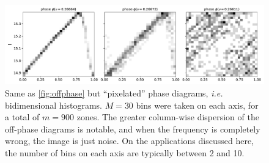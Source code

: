 	\begin{figure}
		\centering
		\includegraphics[width=\textwidth]{img/offhist2d.pdf}
		\caption[Off-frequency phase diagrams: histograms]{
			Same as \autoref{fig:offphase} but \enquote{pixelated} phase diagrams, \textit{i.e.} bidimensional histograms.
			$M=30$ bins were taken on each axis, for a total of $m=900$ zones.
			The greater column-wise dispersion of the off-phase diagrams is notable, 
			and when the frequency is completely wrong, the image is just noise.
			On the applications discussed here, the number of bins on each axis are typically between 2 and 10.
		}
		\label{fig:offhist2d}
	\end{figure}




	
	
	
	
	
	
	
	
	
	
	
	
	
	
	
	
	
	
	
	
	
	
	
	
	
	
	
	
	
	
	
	
	
	